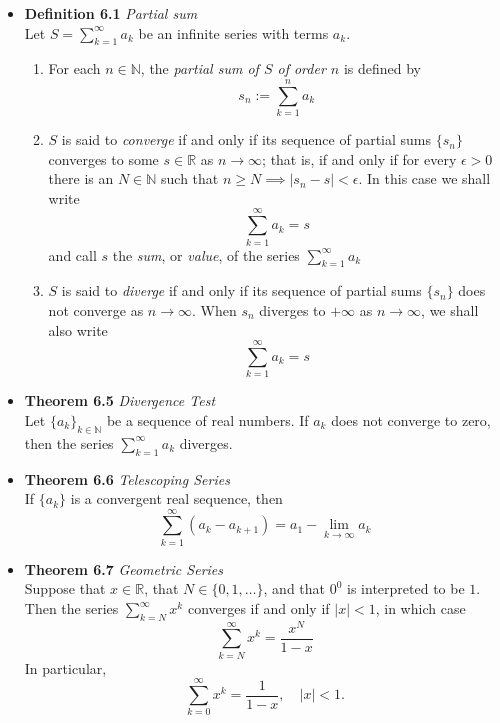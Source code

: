 \documentclass[11pt,a4paper]{article}
\begin{document}
\begin{itemize}

    \item \textbf{Definition 6.1} \emph{Partial sum} \\
        Let $S = \sum_{k=1}^\infty a_k$ be an infinite series with terms $a_k$.
        \begin{enumerate}
            \item For each $n \in \mathbb{N}$, the \emph{partial sum of $S$ of order $n$}
                is defined by
                \[
                    s_n := \sum_{k=1}^n a_k
                \]

            \item $S$ is said to \emph{converge} if and only if its sequence of partial sums
                $\{s_n\}$ converges to some $s \in \mathbb{R}$ as $n \to \infty$;
                that is, if and only if for every $\epsilon > 0$ there is an
                $N \in \mathbb{N}$ such that $n \geq N \implies |s_n - s| < \epsilon$.
                In this case we shall write
                \[
                    \sum_{k=1}^\infty a_k = s
                \]
                and call $s$ the \emph{sum}, or \emph{value}, of the series
                $\sum_{k=1}^\infty a_k$

            \item $S$ is said to \emph{diverge} if and only if its sequence of partial sums
                $\{s_n\}$ does not converge as $n \to \infty$.
            When $s_n$ diverges to $+\infty$ as $n \to \infty$, we shall also write
                \[
                    \sum_{k=1}^\infty a_k = s
                \]
        \end{enumerate}

    \item \textbf{Theorem 6.5} \emph{Divergence Test} \\
        Let ${\{a_k\}}_{k \in \mathbb{N}}$ be a sequence of real numbers.
        If $a_k$ does not converge to zero, then the series $\sum_{k=1}^\infty a_k$ diverges.

    \item \textbf{Theorem 6.6} \emph{Telescoping Series} \\
        If $\{a_k\}$ is a convergent real sequence, then
        \[
            \sum_{k=1}^\infty (a_k - a_{k+1}) = a_1 - \lim_{k \to \infty} a_k
        \]

    \item \textbf{Theorem 6.7} \emph{Geometric Series} \\
        Suppose that $x \in \mathbb{R}$, that $N \in \{ 0, 1, \ldots\}$, and that $0^0$
        is interpreted to be $1$.
        Then the series $\sum_{k=N}^\infty x^k$ converges if and only if $|x| < 1$,
        in which case
        \[
            \sum_{k=N}^\infty x^k = \frac{x^N}{1-x}
        \]
        In particular,
        \[
            \sum_{k=0}^\infty x^k = \frac{1}{1-x}, \quad |x| < 1.
        \]


\end{itemize}
\end{document}
